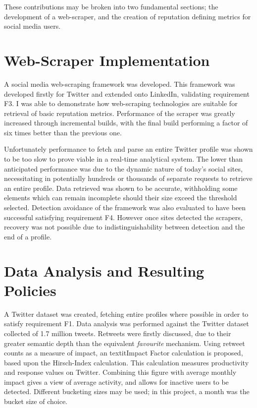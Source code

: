 These contributions may be broken into two fundamental sections; the development of a web-scraper, and the creation of reputation defining metrics for social media users. 



\section{Web-Scraper Implementation}

A social media web-scraping framework was developed. This framework was developed firstly for Twitter and extended onto LinkedIn, validating requirement F3. I was able to demonstrate how web-scraping technologies are suitable for retrieval of basic reputation metrics. Performance of the scraper was greatly increased through incremental builds, with the final build performing a factor of six times better than the previous one.

Unfortunately performance to fetch and parse an entire Twitter profile was shown to be too slow to prove viable in a real-time analytical system. The lower than anticipated performance was due to the dynamic nature of today's social sites, necessitating in potentially hundreds or thousands of separate requests to retrieve an entire profile. Data retrieved was shown to be accurate, withholding some elements which can remain incomplete should their size exceed the threshold selected. Detection avoidance of the framework was also evaluated to have been successful satisfying requirement F4. However once sites detected the scrapers, recovery was not possible due to indistinguishability between detection and the end of a profile. 

\section{Data Analysis and Resulting Policies}

A Twitter dataset was created, fetching entire profiles where possible in order to satisfy requirement F1. Data analysis was performed against the Twitter dataset collected of 1.7 million tweets. Retweets were firstly discussed, due to their greater semantic depth than the equivalent \textit{favourite} mechanism. Using retweet counts as a measure of impact, an textit{Impact Factor} calculation is proposed, based upon the Hirsch-Index calculation. This calculation measures productivity and response values on Twitter. Combining this figure with average monthly impact gives a view of average activity, and allows for inactive users to be detected. Different bucketing sizes may be used; in this project, a month was the bucket size of choice. 

